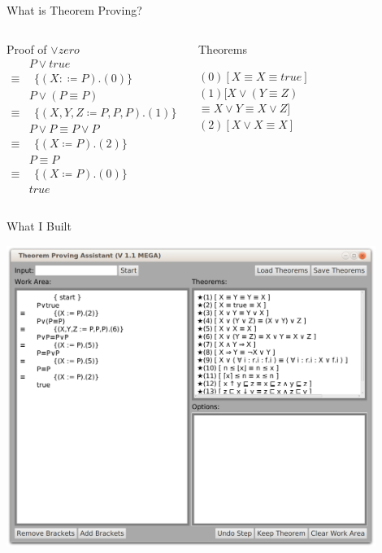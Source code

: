 \documentclass[11pt]{beamer}
\begin{document}
\begin{frame}{What is Theorem Proving?}

\begin{columns}[c]

\begin{block}{Proof of $\vee zero$}
\begin{align*}
&P \vee true \\
\equiv&\ \ \{(X:\coloneqq P).(0)\} \\
&P \vee ( P \equiv P ) \\
\equiv&\ \ \{(X,Y,Z\coloneqq P,P,P ).(1)\} \\
&P \vee P \equiv P \vee P \\
\equiv&\ \ \{(X \coloneqq P).(2)\} \\
&P \equiv P \\
\equiv&\ \ \{(X \coloneqq P).(0)\} \\
& true
\end{align*}
\end{block}

\begin{block}{Theorems}

$(0) [X \equiv X \equiv true ]$\\
$(1) [X \vee (Y \equiv Z)$\\
\qquad\qquad\qquad$ \equiv X \vee Y \equiv X \vee Z]$\\
$(2) [X \vee X \equiv X]$

\end{block}

\end{columns}

\end{frame}

\begin{frame}{What I Built}
\begin{center}
\includegraphics[width=0.9\textwidth]{../TheReport/screenshot}
\end{center}
\end{frame}
\end{document}
